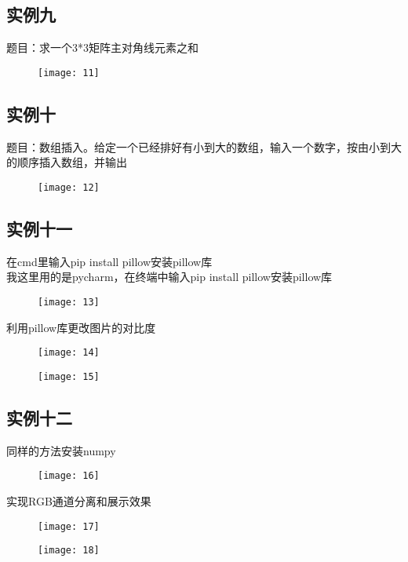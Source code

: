 \documentclass[12pt,letterpaper]{article}
\begin{document}
\subsection{实例九}
题目：求一个3*3矩阵主对角线元素之和
\begin{figure}[H]
\centering
\texttt{[image: 11]}
\end{figure}

\subsection{实例十}
题目：数组插入。给定一个已经排好有小到大的数组，输入一个数字，按由小到大的顺序插入数组，并输出
\begin{figure}[H]
\centering
\texttt{[image: 12]}
\end{figure}

\subsection{实例十一}
在cmd里输入pip install pillow安装pillow库\\
我这里用的是pycharm，在终端中输入pip install pillow安装pillow库
\begin{figure}[H]
\centering
\texttt{[image: 13]}
\end{figure}
利用pillow库更改图片的对比度
\begin{figure}[H]
\centering
\texttt{[image: 14]}
\end{figure}
\vspace{-6mm}
\begin{figure}[H]
\centering
\texttt{[image: 15]}
\end{figure}

\subsection{实例十二}
同样的方法安装numpy
\begin{figure}[H]
\centering
\texttt{[image: 16]}
\end{figure}
实现RGB通道分离和展示效果
\begin{figure}[H]
\centering
\texttt{[image: 17]}
\end{figure}
\vspace{-6mm}
\begin{figure}[H]
\centering
\texttt{[image: 18]}
\end{figure}
\end{document}
